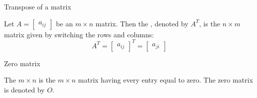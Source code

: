 \documentclass{ximera}
\begin{document}
Transpose of a matrix
\begin{expandable}
    Let $A=\begin{bmatrix} a _{ij}\end{bmatrix}$ be an $m\times n$ matrix. Then the , denoted by $A^{T}$, is the $n\times m$
matrix given by switching the rows and columns:
\begin{equation*}
A^{T} = \begin{bmatrix} a _{ij}\end{bmatrix}^{T}= \begin{bmatrix} a_{ji} \end{bmatrix}
\end{equation*}
\end{expandable}



Zero matrix
\begin{expandable}
    The $m\times n$  is the $m\times n$ matrix
having every entry equal to zero. The zero matrix is
denoted by $O$.
\end{expandable}

 
\end{document}
